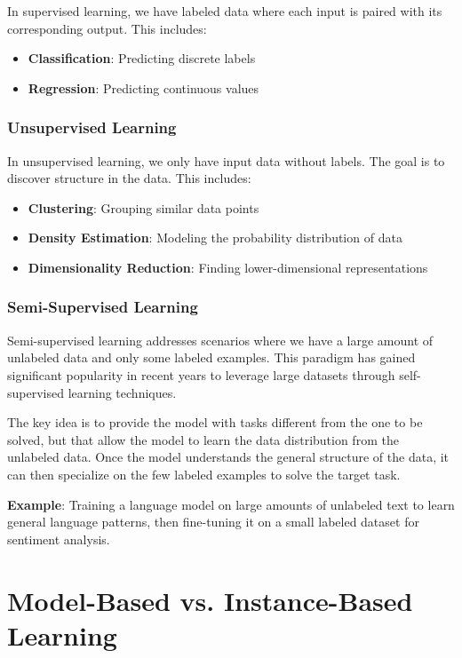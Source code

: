 \documentclass[11pt,a4paper]{article}
\theoremstyle{definition}
\theoremstyle{plain}
\theoremstyle{remark}
\begin{document}
In supervised learning, we have labeled data where each input is paired with its corresponding output. This includes:
\begin{itemize}
    \item \textbf{Classification}: Predicting discrete labels
    \item \textbf{Regression}: Predicting continuous values
\end{itemize}

\subsubsection{Unsupervised Learning}

In unsupervised learning, we only have input data without labels. The goal is to discover structure in the data. This includes:
\begin{itemize}
    \item \textbf{Clustering}: Grouping similar data points
    \item \textbf{Density Estimation}: Modeling the probability distribution of data
    \item \textbf{Dimensionality Reduction}: Finding lower-dimensional representations
\end{itemize}

\subsubsection{Semi-Supervised Learning}

Semi-supervised learning addresses scenarios where we have a large amount of unlabeled data and only some labeled examples. This paradigm has gained significant popularity in recent years to leverage large datasets through self-supervised learning techniques.

The key idea is to provide the model with tasks different from the one to be solved, but that allow the model to learn the data distribution from the unlabeled data. Once the model understands the general structure of the data, it can then specialize on the few labeled examples to solve the target task.

\textbf{Example}: Training a language model on large amounts of unlabeled text to learn general language patterns, then fine-tuning it on a small labeled dataset for sentiment analysis.

\section{Model-Based vs. Instance-Based Learning}
\end{document}
